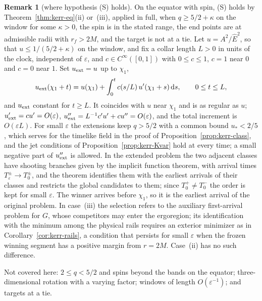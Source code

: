 \documentclass[aip,jmp,amsmath,amssymb,reprint]{revtex4-2}
\newcommand{\Ehat}{\hat E}
\newcommand{\dd}{\mathrm{d}}
\theoremstyle{plain}
\theoremstyle{definition}
\newtheorem{remark}[proposition]{Remark}
\begin{document}
\begin{remark}[where hypothesis (S) holds]
On the equator with spin, (S) holds by Theorem~\ref{thm:kerr-eq}(ii) or~(iii), applied in full,
when $q\ge5/2+\kappa$ on the window for some $\kappa>0$, the spin is in the stated range, the
end points are at admissible radii with $r_f>2M$, and the target is not at a tie. Let $u=A^2/\Ehat^2$,
so that $u\le1/(5/2+\kappa)$ on the window, and fix a collar length $L>0$ in units of the clock,
independent of $\varepsilon$, and $c\in C^\infty([0,1])$ with $0\le c\le1$, $c=1$ near $0$ and $c=0$
near $1$. Set $u_{\rm ext}=u$ up to $\chi_1$,
\[
  u_{\rm ext}(\chi_1+t)=u(\chi_1)+\int_0^tc(s/L)\,u'(\chi_1+s)\,\dd s,\qquad 0\le t\le L,
\]
and $u_{\rm ext}$ constant for $t\ge L$. It coincides with $u$ near $\chi_1$ and is as regular as $u$;
$u_{\rm ext}'=cu'=O(\varepsilon)$, $u_{\rm ext}''=L^{-1}c'u'+cu''=O(\varepsilon)$, and the total increment is
$O(\varepsilon L)$. For small $\varepsilon$ the extensions keep $q>5/2$ with a common bound $u_*<2/5$,
which serves for the timelike field in the proof of Proposition~\ref{prop:kerr-class}, and the jet
conditions of Proposition~\ref{prop:kerr-Kvar} hold at every time; a small negative part of
$u_{\rm ext}''$ is allowed. In the extended problem the two adjacent classes have shooting branches
given by the implicit function theorem, with arrival times $T^\pm_\varepsilon\to T^\pm_0$, and the theorem
identifies them with the earliest arrivals of their classes and restricts the global candidates to
them; since $T^+_0\ne T^-_0$ the order is kept for small $\varepsilon$. The winner arrives before
$\chi_1$, so it is the earliest arrival of the original problem. In case~(iii) the selection refers
to the auxiliary first-arrival problem for $G$, whose competitors may enter the ergoregion; its
identification with the minimum among the physical rails requires an exterior minimizer as in
Corollary~\ref{cor:kerr-rails}, a condition that persists for small $\varepsilon$ when the frozen
winning segment has a positive margin from $r=2M$. Case~(ii) has no such difference.

Not covered here: $2\le q<5/2$ and spins beyond the bands on the equator; three-dimensional rotation
with a varying factor; windows of length $O(\varepsilon^{-1})$; and targets at a tie.
\end{remark}

\end{document}
